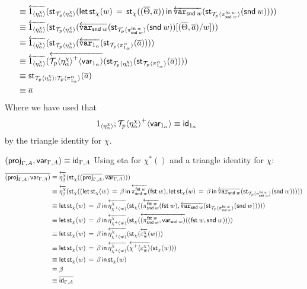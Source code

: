 \documentclass[10pt]{article}
\theoremstyle{definition}
\newcommand\dsd[1]{\ensuremath{\mathsf{#1}}}
\newcommand{\app}[2]{\ensuremath{#1 \: #2}}
\newcommand{\fst}[1]{\app{\dsd{fst}}{#1}}
\newcommand{\snd}[1]{\app{\dsd{snd}}{#1}}
\newcommand{\id}{\mathsf{id}}
\newcommand{\rewrite}[2]{\overleftarrow{#1}(#2)}
\newcommand\St[2]{\ensuremath{{#1}^*(#2)}}
\newcommand\StI[2]{\ensuremath{\mathsf{st}_{#1}(#2)}}
\newcommand\StE[4]{\ensuremath{\mathsf{let} \, \StI{#1}{#3} \, = \, {#2} \, \mathsf{in} \, #4}}
\newcommand\TrPlus[2]{\ensuremath{{#1}^+(#2)}}
\newcommand\ApEl[2]{\mathcal{T}_{#1}\langle#2\rangle}
\newcommand\ApPlus[2]{\ensuremath{{#1}^+ \langle #2 \rangle }}
\begin{document}
\begin{enumerate}[style = multiline, labelwidth = 80pt]
\begin{align*}
&\equiv \rewrite{1_{\langle \eta^\chi_\alpha \rangle}}{\StI{\ApEl{p}{\eta^\chi_\alpha}}{\StE{\chi}{\StI{\chi}{(\upstairs{\Theta}, \upstairs{a})}}{w}{\rewrite{\var{\snd w}}{\StI{\ApEl{p}{\pi^{\fst w}_{\snd w}}}{\snd w}}}}} \\
&\equiv \rewrite{1_{\langle \eta^\chi_\alpha \rangle}}{\StI{\ApEl{p}{\eta^\chi_\alpha}}{\rewrite{\var{\snd w}}{\StI{\ApEl{p}{\pi^{\fst w}_{\snd w}}}{\snd w}}[(\upstairs{\Theta}, \upstairs{a})/w]}} \\
&\equiv \rewrite{1_{\langle \eta^\chi_\alpha \rangle}}{\StI{\ApEl{p}{\eta^\chi_\alpha}}{\rewrite{\var{1_\alpha}}{\StI{\ApEl{p}{\pi^{\alpha}_{1_\alpha}}}{\upstairs{a}}}}} \\
&\equiv \rewrite{1_{\langle \eta^\chi_\alpha \rangle}}{\rewrite{\ApPlus{\ApEl{p}{\eta^\chi_\alpha}}{\qvar{1_\alpha}}}{\StI{\ApEl{p}{\eta^\chi_\alpha}}{\StI{\ApEl{p}{\pi^{\alpha}_{1_\alpha}}}{\upstairs{a}}}}} \\
&\equiv \StI{\ApEl{p}{\eta^\chi_\alpha};\ApEl{p}{\pi^{\alpha}_{1_\alpha}}}{\upstairs{a}} \\
&\equiv \upstairs{a}
\end{align*}
Where we have used that
\begin{align*}
\ApOne{\eta^\chi_\alpha};\ApPlus{\ApEl{p}{\eta^\chi_\alpha}}{\qvar{1_\alpha}} \equiv \id_{1_\alpha}
\end{align*}
by the triangle identity for $\chi$.
\item[{$(\proj{\Gamma,A}, \qvar{\Gamma,A}) \equiv \id_{\Gamma, A}$}] Using eta for $\St{\chi}{}$ and a triangle identity for $\chi$:
\begin{align*}
\upstairs{(\proj{\Gamma,A}, \qvar{\Gamma,A})}
&\equiv \rewrite{\eta^\chi_{\beta}}{\StI{\chi}{(\upstairs{\proj{\Gamma,A}}, \upstairs{\qvar{\Gamma,A}})}} \\
&\equiv \rewrite{\eta^\chi_{\beta}}{\StI{\chi}{(\StE{\chi}{\beta}{w}{\rewrite{\pi^{\fst w}_{\snd w}}{\fst w}}, \StE{\chi}{\beta}{w}{\rewrite{\var{\snd w}}{\StI{\ApEl{p}{\pi^{\fst w}_{\snd w}}}{\snd w}}})}} \\
&\equiv \StE{\chi}{\beta}{w}{\rewrite{\eta^\chi_{\TrPlus{\chi}{w}}}{\StI{\chi}{(\rewrite{\pi^{\fst w}_{\snd w}}{\fst w}, \rewrite{\var{\snd w}}{\StI{\ApEl{p}{\pi^{\fst w}_{\snd w}}}{\snd w}})}}} \\
&\equiv \StE{\chi}{\beta}{w}{\rewrite{\eta^\chi_{\TrPlus{\chi}{w}}}{\StI{\chi}{\rewrite{(\pi^{\fst w}_{\snd w},\qvar{\snd w})}{(\fst w, \snd w)}}}} \\
&\equiv \StE{\chi}{\beta}{w}{\rewrite{\eta^\chi_{\TrPlus{\chi}{w}}}{\StI{\chi}{\rewrite{\varepsilon^\chi_w}{w}}}} \\
&\equiv \StE{\chi}{\beta}{w}{\rewrite{\eta^\chi_{\TrPlus{\chi}{w}}}{\rewrite{\ApPlus{\chi}{\varepsilon^\chi_w}}{\StI{\chi}{w}}}} \\
&\equiv \StE{\chi}{\beta}{w}{\StI{\chi}{w}} \\
&\equiv \beta \\
&\equiv \upstairs{\id_{\Gamma, A}}
\end{align*}


\end{enumerate}
\end{document}
